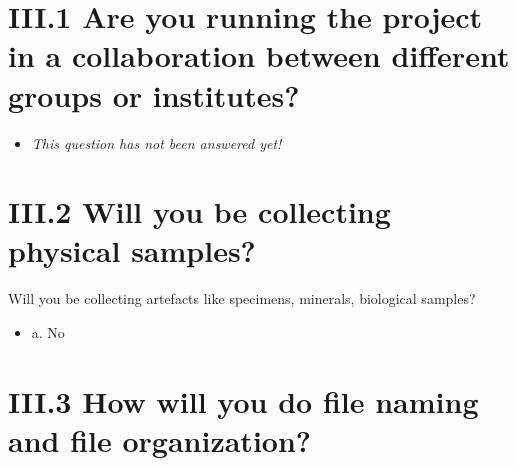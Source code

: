 \documentclass[a4paper,12pt]{report}
\begin{document}
\section*{\protect\textcolor{colorSecId}{III.1} Are you running the project in a collaboration between different groups or institutes?}

\label{b1df3c74-0b1f-4574-81c4-4cc2d780c1af.b2fb6b4e-2961-40a4-a9ec-faf4e49a978b}






\begin{itemize}
  \item[\XSolidBrush] \textit{This question has not been answered yet!}
\end{itemize}
  


\section*{\protect\textcolor{colorSecId}{III.2} Will you be collecting physical samples?}

\label{b1df3c74-0b1f-4574-81c4-4cc2d780c1af.0e810343-6026-4992-8ea0-5539cbc77093}




\noindent
\begin{markdown}
Will you be collecting artefacts like specimens, minerals, biological samples?
\end{markdown}



\begin{itemize}
  \item[\CheckmarkBold] a. No
\end{itemize}






\section*{\protect\textcolor{colorSecId}{III.3} How will you do file naming and file organization?}

\label{b1df3c74-0b1f-4574-81c4-4cc2d780c1af.8e886b55-3287-48e7-b353-daf6ab40f7d8}
\end{document}
